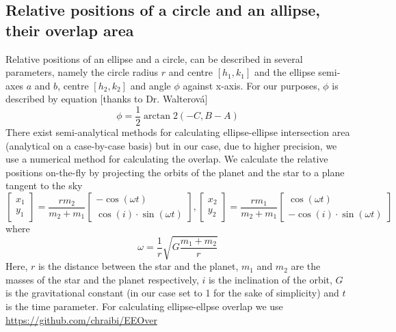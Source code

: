 \documentclass[10pt]{article}
\numberwithin{equation}{subsection}
\begin{document}
\subsection{Relative positions of a circle and an allipse, their overlap area}
Relative positions of an ellipse and a circle, can be described
in several parameters, namely the circle radius $r$ and centre $[h_1, k_1]$ and the
ellipse semi-axes $a$ and $b$, centre $[h_2, k_2]$ and angle $\phi$ against x-axis. For
our purposes, $\phi$ is described by equation \cite{correia1} [thanks to Dr. Walterová]
\begin{equation}
  \phi = \frac{1}{2}\arctan 2(-C, B-A)
  \label{eq:phi}
\end{equation}
There exist semi-analytical methods for calculating ellipse-ellipse intersection area
(analytical on a case-by-case basis) \cite{eeover} but in our case, due to higher
precision, we use a numerical method for calculating the overlap.
We calculate the relative positions on-the-fly by projecting the orbits of the planet
and the star to a plane tangent to the sky
\begin{equation}
  \begin{bmatrix}
    x_1 \\
    y_1 
  \end{bmatrix}
  = \frac{rm_2}{m_2+m_1}
  \begin{bmatrix}
    -\cos(\omega t) \\
    \cos(i)\cdot\sin(\omega t)
  \end{bmatrix},
  \begin{bmatrix}
    x_2 \\
    y_2 
  \end{bmatrix}
  = \frac{rm_1}{m_2+m_1}
  \begin{bmatrix}
    \cos(\omega t) \\
    -\cos(i)\cdot\sin(\omega t)
  \end{bmatrix}
  \label{eq:projected-orbit}
\end{equation}
where
\begin{equation}
  \omega = \frac{1}{r}\sqrt{G\frac{m_1 + m_2}{r}}
  \label{eq:omega}
\end{equation}
Here, $r$ is the distance between the star and the planet, $m_1$ and $m_2$ are the masses
of the star and the planet respectively, $i$ is the inclination of the orbit, $G$ is the
gravitational constant (in our case set to 1 for the sake of simplicity) and $t$ is the
time parameter.
For calculating ellipse-ellpse overlap we use \url{https://github.com/chraibi/EEOver}
\end{document}
